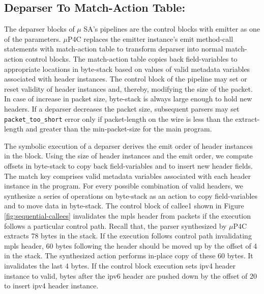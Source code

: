 \subsection{Deparser To Match-Action Table:}
\label{subsection:deparser-to-match-action-table}
The deparser blocks of $\mu$ SA's pipelines are the control blocks with emitter as one of the parameters.
$\mu$P4C replaces the emitter instance's emit method-call statements with match-action table to transform deparser into normal match-action control blocks.
The match-action table copies back field-variables to appropriate locations in byte-stack based on values of valid metadata variables associated with header instances. 
The control block of the pipeline may set or reset validity of header instances and, thereby, modifying the size of the packet.
In case of increase in packet size, byte-stack is always large enough to hold new headers.
If a deparser decreases the packet size, subsequent parsers may set \texttt{packet\_too\_short} error only if packet-length on the wire is less than the extract-length and greater than the min-packet-size for the main program.

The symbolic execution of a deparser derives the emit order of header instances in the block.
Using the size of header instances and the emit order, we compute offsets in byte-stack to copy back field-variables and to insert new header fields.
The match key comprises valid metadata variables associated with each header instance in the program.
For every possible combination of valid headers, we synthesize a series of operations on byte-stack as an action to copy field-variables and to move data in byte-stack.
The control block of callee1 shown in Figure \ref{fig:sequential-callees} invalidates the mpls header from packets if the execution follows a particular control path.
Recall that, the parser synthesized by $\mu$P4C extracts 78 bytes in the stack.
If the execution follows control path invalidating mpls header, 60 bytes following the header should be moved up by the offset of 4 in the stack.
The synthesized action performs in-place copy of these 60 bytes. It invalidates the last 4 bytes.
If the control block execution sets ipv4 header instance to valid, bytes after the ipv6 header are pushed down by the offset of 20 to insert ipv4 header instance.




